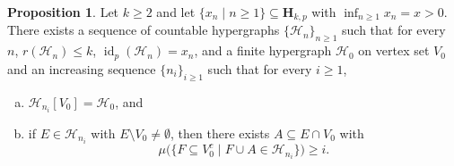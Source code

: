 \documentclass[11pt,reqno]{amsart}
\theoremstyle{definition}
\newtheorem{proposition}[theorem]{Proposition}
\begin{document}
\begin{proposition}\label{prop:almost-const-subseq}
Let $k \geq 2$ and let $\{x_n \mid n \geq 1 \} \subseteq \mathbf{H}_{k,p}$  with $\inf_{n \geq 1} x_n = x > 0$. There exists a sequence of countable hypergraphs $\{\mathcal{H}_n\}_{n \geq 1}$ such that for every~$n$, $r(\mathcal{H}_n) \leq k$, ${\operatorname{id}}_p(\mathcal{H}_n) = x_n$, and a finite hypergraph $\mathcal{H}_0$ on vertex set $V_0$ and an increasing sequence $\{n_i\}_{i \geq 1}$ such that for every $i \geq 1$,
\begin{enumerate}[(a)]
	\item $\mathcal{H}_{n_i}[V_0] = \mathcal{H}_0$, and
	\item if $E \in \mathcal{H}_{n_i}$ with $E \setminus V_0 \neq \emptyset$, then there exists $A \subseteq E \cap V_0$ with
	\[
	 \mu\big(\{F \subseteq V_0^c \mid F \cup A \in \mathcal{H}_{n_i}\}\big) \geq i.
	\]
\end{enumerate}
\end{proposition}
\end{document}
